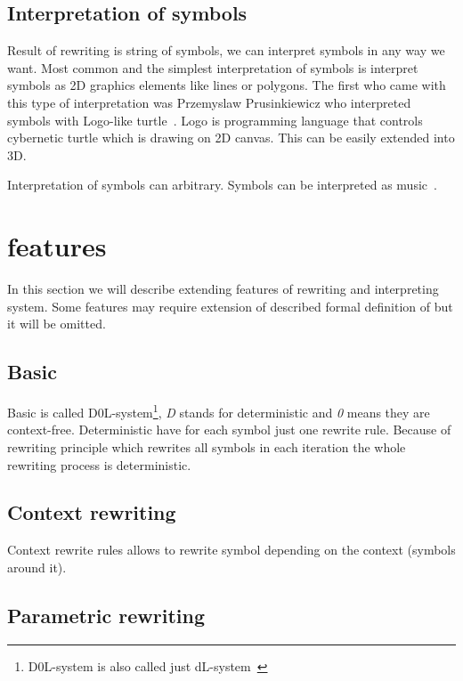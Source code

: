 \subsection{Interpretation of \lsystem symbols}

Result of \lsystem rewriting is string of symbols, we can interpret symbols in any way we want.
Most common and the simplest interpretation of \lsystem symbols is interpret symbols as 2D graphics elements like lines or polygons.
The first who came with this type of interpretation was Przemyslaw Prusinkiewicz who interpreted \lsystem symbols with Logo-like turtle~\cite{Pru85}.
Logo is programming language that controls cybernetic turtle which is drawing on 2D canvas.
This can be easily extended into 3D.

Interpretation of symbols can arbitrary.
Symbols can be interpreted as music~\cite{HCJ99, Man06}.


\section{\lsystem features}

In this section we will describe extending features of \lsystem rewriting and interpreting system.
Some features may require extension of described formal definition of \lsystem but it will be omitted.


\subsection{Basic \lsystem}

Basic \lsystem is called D0L-system\footnote{D0L-system is also called just dL-system~\cite{Zar04}}, \emph{D} stands for deterministic and \emph{0} means they are context-free.
Deterministic \lsystems have for each symbol just one rewrite rule.
Because of rewriting principle which rewrites all symbols in each iteration the whole rewriting process is deterministic.


\subsection{Context rewriting}

Context rewrite rules allows to rewrite symbol depending on the context (symbols around it).



\subsection{Parametric rewriting}

